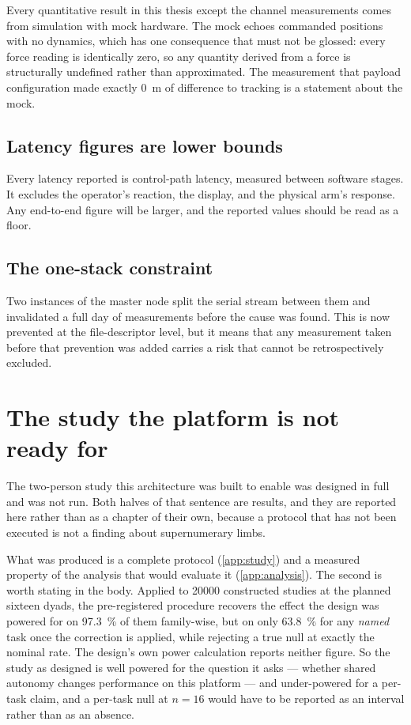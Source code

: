 Every quantitative result in this thesis except the channel measurements comes
from simulation with mock hardware. The mock echoes commanded positions with
no dynamics, which has one consequence that must not be glossed: every force
reading is identically zero, so any quantity derived from a force is
structurally undefined rather than approximated. The measurement that payload
configuration made exactly \SI{0}{\metre} of difference to tracking is a
statement about the mock.

\subsection{Latency figures are lower bounds}

Every latency reported is control-path latency, measured between software
stages. It excludes the operator's reaction, the display, and the physical
arm's response. Any end-to-end figure will be larger, and the reported values
should be read as a floor.

\subsection{The one-stack constraint}

Two instances of the master node split the serial stream between them and
invalidated a full day of measurements before the cause was found. This is now
prevented at the file-descriptor level, but it means that any measurement
taken before that prevention was added carries a risk that cannot be
retrospectively excluded.

\section{The study the platform is not ready for}
\label{sec:not-run}

The two-person study this architecture was built to enable was designed in
full and was not run. Both halves of that sentence are results, and they are
reported here rather than as a chapter of their own, because a protocol that
has not been executed is not a finding about supernumerary limbs.

What was produced is a complete protocol (\cref{app:study}) and a measured
property of the analysis that would evaluate it (\cref{app:analysis}). The
second is worth stating in the body. Applied to \num{20000} constructed
studies at the planned sixteen dyads, the pre-registered procedure recovers
the effect the design was powered for on \SI{97.3}{\percent} of them
family-wise, but on only \SI{63.8}{\percent} for any \emph{named} task once
the correction is applied, while rejecting a true null at exactly the nominal
rate. The design's own power calculation reports neither figure. So the study
as designed is well powered for the question it asks --- whether shared
autonomy changes performance on this platform --- and under-powered for a
per-task claim, and a per-task null at $n = 16$ would have to be reported as
an interval rather than as an absence.

